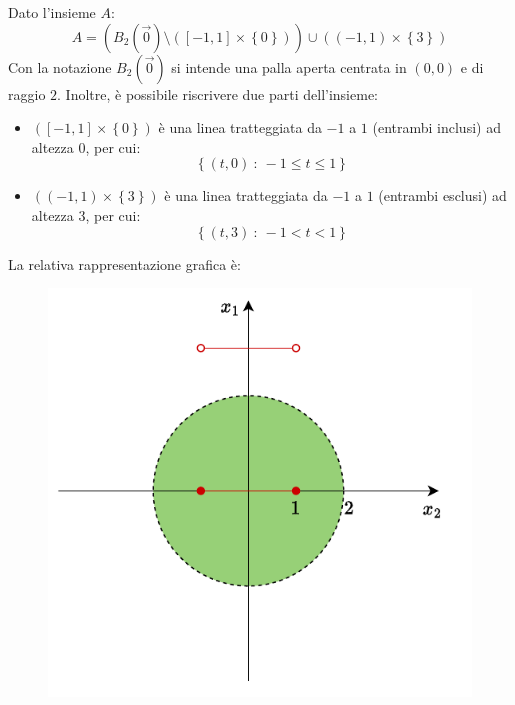 \documentclass[a4paper]{article}
\begin{document}
	\noindent
	Dato l'insieme $A$:
	\begin{equation*}
		A = \left(B_{2}\left(\overrightarrow{0}\right) \setminus \left(\left[-1,1\right] \times \left\{0\right\}\right)\right) \cup \left(\left(-1,1\right) \times \left\{3\right\}\right)
	\end{equation*}
	Con la notazione $B_{2}\left(\overrightarrow{0}\right)$ si intende una palla aperta centrata in $\left(0,0\right)$ e di raggio $2$. Inoltre, è possibile riscrivere due parti dell'insieme:
	\begin{itemize}
		\item $\left(\left[-1,1\right] \times \left\{0\right\}\right)$ è una linea tratteggiata da $-1$ a $1$ (entrambi inclusi) ad altezza $0$, per cui:
		\begin{equation*}
			\left\{\left(t,0\right) \: : \: -1 \le t \le 1\right\}
		\end{equation*}

		\item $\left(\left(-1,1\right) \times \left\{3\right\}\right)$ è una linea tratteggiata da $-1$ a $1$ (entrambi esclusi) ad altezza $3$, per cui:
		\begin{equation*}
			\left\{\left(t,3\right) \: : \: -1 < t < 1\right\}
		\end{equation*}
	\end{itemize}
	La relativa rappresentazione grafica è:
	\begin{figure}[!htp]
		\centering
		\includegraphics[width=.65\textwidth]{img/insiemi_aperti-chiusi-3.pdf}
	\end{figure}
\end{document}
